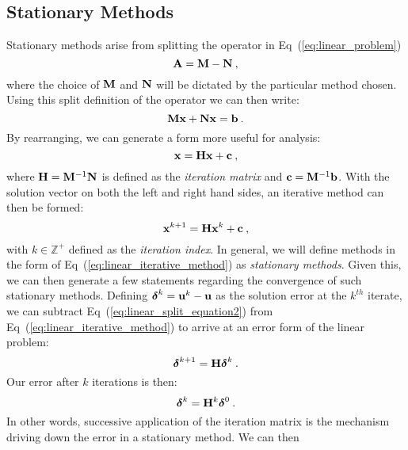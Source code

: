 \subsection{Stationary Methods}
\label{subsec:stationary_methods}
Stationary methods arise from splitting the operator in
Eq~(\ref{eq:linear_problem})
\begin{equation}
  \mathbf{A} = \mathbf{M} - \mathbf{N}\:,
  \label{eq:split_linear_operator}
\end{equation}
where the choice of $\mathbf{M}$ and $\mathbf{N}$ will be dictated by the
particular method chosen. Using this split definition of the operator
we can then write:
\begin{equation}
  \mathbf{M}\mathbf{x} + \mathbf{N}\mathbf{x} = \mathbf{b}\:.
  \label{eq:linear_split_equation1}
\end{equation}
By rearranging, we can generate a form more useful for analysis:
\begin{equation}
  \mathbf{x} = \mathbf{H}\mathbf{x} + \mathbf{c}\:,
  \label{eq:linear_split_equation2}
\end{equation}
where $\mathbf{H}=\mathbf{M}^{-1}\mathbf{N}$ is defined as the \textit{iteration
  matrix} and $\mathbf{c}=\mathbf{M}^{-1}\mathbf{b}$. With the solution vector on
both the left and right hand sides, an iterative method can then be
formed:
\begin{equation}
    \mathbf{x}^{k+1} = \mathbf{H}\mathbf{x}^k + \mathbf{c}\:,
  \label{eq:linear_iterative_method}
\end{equation}
with $k \in \mathbb{Z}^+$ defined as the \textit{iteration index}. In
general, we will define methods in the form of
Eq~(\ref{eq:linear_iterative_method}) as \textit{stationary
  methods}. Given this, we can then generate a few statements
regarding the convergence of such stationary methods. Defining
$\boldsymbol{\delta}^k = \mathbf{u}^k - \mathbf{u}$ as the solution error at the
$k^{th}$ iterate, we can subtract Eq~(\ref{eq:linear_split_equation2})
from Eq~(\ref{eq:linear_iterative_method}) to arrive at an error form
of the linear problem:
\begin{equation}
  \boldsymbol{\delta}^{k+1} = \mathbf{H}\boldsymbol{\delta}^k\:. 
  \label{eq:linear_iterative_error}
\end{equation}
Our error after $k$ iterations is then:
\begin{equation}
  \boldsymbol{\delta}^{k} = \mathbf{H}^k\boldsymbol{\delta}^0\:. 
  \label{eq:linear_k_iter_error}
\end{equation}
In other words, successive application of the iteration matrix is the
mechanism driving down the error in a stationary method. We can then
